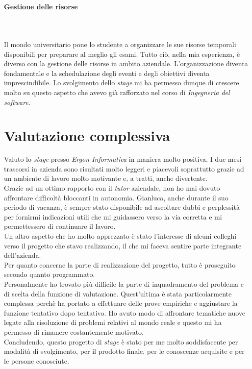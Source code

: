 \paragraph{Gestione delle risorse}\hfill\\\\
Il mondo universitario pone lo studente a organizzare le sue risorse temporali disponibili
per preparare al meglio gli esami. Tutto ciò, nella mia esperienza, è diverso con la
gestione delle risorse in ambito aziendale. L'organizzazione diventa fondamentale
e la schedulazione degli eventi e degli obiettivi diventa imprescindibile.
Lo svolgimento dello \textit{stage} mi ha permesso dunque di crescere molto su questo aspetto
che avevo già rafforzato nel corso di \textit{Ingegneria del software}.

\section{Valutazione complessiva}
\noindent Valuto lo \textit{stage} presso \textit{Ergon Informatica} in maniera molto positiva. I due mesi trascorsi in azienda sono risultati molto leggeri e piacevoli soprattutto grazie
ad un ambiente di lavoro molto motivante e, a tratti, anche divertente.\\

\noindent Grazie ad un ottimo rapporto con il \textit{\textit{tutor}} aziendale, non ho mai dovuto
affrontare difficoltà bloccanti in autonomia. Gianluca, anche durante il suo periodo di vacanza, è sempre stato disponibile
ad ascoltare dubbi e perplessità per fornirmi indicazioni utili che mi guidassero
verso la via corretta e mi permettessero di continuare il lavoro.\\
Un altro aspetto che ho molto apprezzato è stato l'interesse di alcuni colleghi
verso il progetto che stavo realizzando, il che mi faceva sentire parte integrante
dell'azienda.\\

\noindent Per quanto concerne la parte di realizzazione del progetto, tutto è proseguito secondo quanto programmato.\\
Personalmente ho trovato più difficile la parte di inquadramento del problema e di scelta della funzione di valutazione.
Quest'ultima è stata particolarmente complessa perchè ha portato a
effettuare delle prove empiriche e aggiustare la funzione tentativo dopo tentativo.
Ho avuto modo di affrontare tematiche nuove legate alla risoluzione di problemi
relativi al mondo reale e questo mi ha permesso di rimanere costantemente motivato.\\

\noindent Concludendo, questo progetto di \textit{stage} è stato per me
molto soddisfacente per modalità di svolgimento, per il prodotto finale, per le conoscenze acquisite e per le persone conosciute.